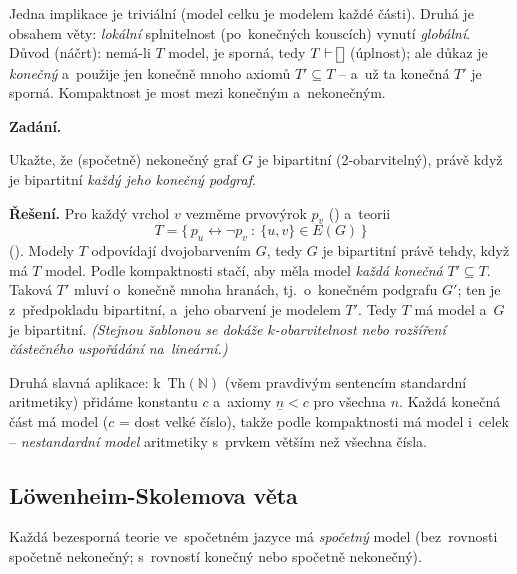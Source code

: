 \documentclass[11pt,a4paper]{article}
\newcommand{\eclause}{\mathord{\text{\framebox[1.25ex][c]{\rule{0pt}{0.95ex}}}}}
\begin{document}
\begin{intuice}
Jedna implikace je triviální (model celku je modelem každé části). Druhá je obsahem věty: \emph{lokální} splnitelnost (po~konečných kouscích) vynutí \emph{globální}. Důvod (náčrt): nemá-li $T$ model, je sporná, tedy $T\vdash\eclause$ (úplnost); ale důkaz je \emph{konečný} a~použije jen konečně mnoho axiomů $T'\subseteq T$ -- a~už ta konečná $T'$ je sporná. Kompaktnost je most mezi konečným a~nekonečným.
\end{intuice}

\begin{priklad}
\textbf{Zadání.}\par
Ukažte, že (spočetně) nekonečný graf $G$ je bipartitní (2-obarvitelný), právě když je bipartitní \emph{každý jeho konečný podgraf}.

\smallskip
\textbf{Řešení.} Pro každý vrchol $v$ vezměme prvovýrok $p_v$ () a~teorii
\[
T=\{\,p_u\leftrightarrow\neg p_v\ :\ \{u,v\}\in E(G)\,\}
\]
(). Modely $T$ odpovídají dvojobarvením $G$, tedy $G$ je bipartitní právě tehdy, když má $T$ model. Podle kompaktnosti stačí, aby měla model \emph{každá konečná} $T'\subseteq T$. Taková $T'$ mluví o~konečně mnoha hranách, tj.\ o~konečném podgrafu $G'$; ten je z~předpokladu bipartitní, a~jeho obarvení je modelem $T'$. Tedy $T$ má model a~$G$ je bipartitní. \emph{(Stejnou šablonou se dokáže $k$-obarvitelnost nebo rozšíření částečného uspořádání na~lineární.)}
\end{priklad}

\begin{intuice}
Druhá slavná aplikace: k~$\mathrm{Th}(\mathbb{N})$ (všem pravdivým sentencím standardní aritmetiky) přidáme konstantu $c$ a~axiomy $\underline n<c$ pro všechna $n$. Každá konečná část má model ($c$ = dost velké číslo), takže podle kompaktnosti má model i~celek -- \emph{nestandardní model} aritmetiky s~prvkem větším než všechna  čísla.
\end{intuice}

\subsection{Löwenheim-Skolemova věta}

\begin{veta}
Každá bezesporná teorie ve~spočetném jazyce má \emph{spočetný} model (bez~rovnosti spočetně nekonečný; s~rovností konečný nebo spočetně nekonečný).
\end{veta}
\end{document}
